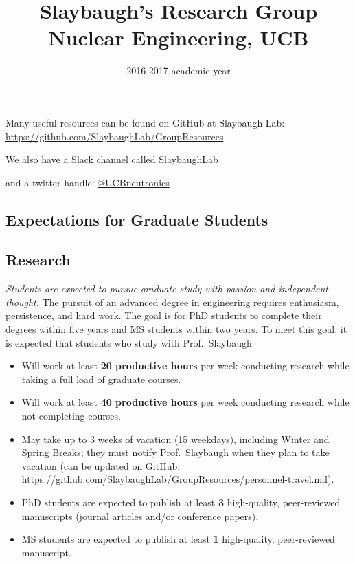 \documentclass[12pt,twoside]{article}
\date{2016-2017 academic year}
\title{Slaybaugh's Research Group \\ Nuclear Engineering, UCB}
\begin{document}
\maketitle

Many useful resources can be found on GitHub at Slaybaugh Lab:\\ \hspace*{2 em} \href{https://github.com/SlaybaughLab/GroupResources}{https://github.com/SlaybaughLab/GroupResources}

We also have a Slack channel called \href{https://slaybaugh.slack.com/messages/general/}{SlaybaughLab}

and a twitter handle: \href{https://twitter.com/UCBneutronics}{@UCBneutronics}

\begin{center}
\section*{Expectations for Graduate Students}
\end{center}

\subsection*{Research}

\textit{Students are expected to pursue graduate study with passion and independent thought.} The pursuit of an advanced degree in engineering requires enthusiasm, persistence, and hard work. The goal is for PhD students to complete their degrees within five years and MS students within two years. To meet this goal, it is expected that students who study with Prof.\ Slaybaugh
%
\begin{itemize}
\item Will work at least \textbf{20 productive hours} per week conducting research while taking a full load of graduate courses.
\item Will work at least \textbf{40 productive hours} per week conducting research while not completing courses.
\item May take up to 3 weeks of vacation (15 weekdays), including Winter and Spring Breaks; they must notify Prof.\ Slaybaugh when they plan to take vacation (can be updated on GitHub: \href{https://github.com/SlaybaughLab/GroupResources/personnel-travel.md}{https://github.com/SlaybaughLab/GroupResources/personnel-travel.md}).
\item PhD students are expected to publish at least \textbf{3} high-quality, peer-reviewed manuscripts (journal articles and/or conference papers).
\item MS students are expected to publish at least \textbf{1} high-quality, peer-reviewed manuscript.
\end{itemize}
\end{document}
